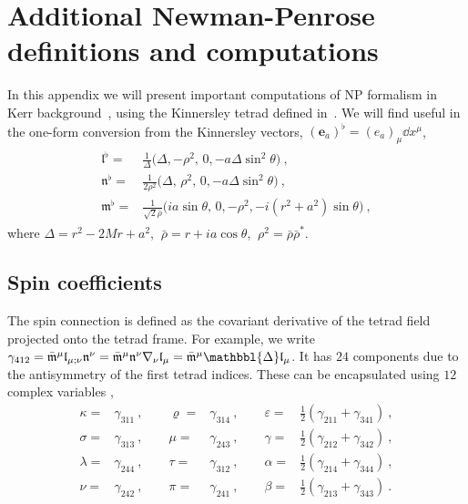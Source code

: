 
\chapter{Additional Newman-Penrose definitions and computations} %
\label{AppendixNPFormalism}

In this appendix we will present important computations of NP formalism in Kerr background~, using the Kinnersley tetrad defined in~.
We will find useful in the one-form conversion from the Kinnersley vectors, $(\bm{e}_a)^\flat = (e_a)_\mu \dd x^\mu$,
\begin{align}
    \begin{split}
        \bm{\mathfrak{l}}^\flat =& \frac{1}{\Delta} \Bigr(\Delta, -\rho^2, \,0, -a \Delta \sin^2\theta \Bigr) ~, \\
        \bm{\mathfrak{n}}^\flat =& \frac{1}{2 \rho^2} \Bigr(\Delta, \,\rho^2, \,0, -a \Delta \sin^2\theta \Bigr) ~, \\
        \bm{\mathfrak{m}}^\flat =& \frac{1}{ \sqrt{2} \bar{\rho} } \Bigr( i a \sin\theta, \,0, -\rho^2, - i (r^2+a^2) \sin\theta \Bigr) ~,
    \end{split}
\end{align}
where $\Delta=r^2-2 M r + a^2$, $~\bar{\rho} = r + i a \cos\theta$, $~\rho^2 = \bar{\rho} \bar{\rho}^*$.

\section{Spin coefficients}
\label{AppendixNPSpinCoef}

The spin connection is defined as the covariant derivative of the tetrad field projected onto the tetrad frame. 
For example, we write $\gamma_{412} = \bar{\mathfrak{m}}^\mu \mathfrak{l}_{\mu;\nu} \mathfrak{n}^\nu =  \bar{\mathfrak{m}}^\mu \mathfrak{n}^\nu \nabla_\nu \mathfrak{l}_{\mu} = \bar{\mathfrak{m}}^\mu \mathbbl{\Delta} \mathfrak{l}_\mu$.
It has $24$ components due to the antisymmetry of the first tetrad indices. These can be encapsulated using $12$ complex variables \cite{Chandrasekhar1998},
\begin{equation}
    \begin{alignedat}{4}
        \kappa  =& \gamma_{311} ~,\qquad \varrho =& \gamma_{314} ~,\qquad \varepsilon =& \tfrac{1}{2} (\gamma_{211} + \gamma_{341}) ~, \\
        \sigma  =& \gamma_{313} ~,\qquad \mu     =& \gamma_{243} ~,\qquad \gamma      =& \tfrac{1}{2} (\gamma_{212} + \gamma_{342}) ~, \\
        \lambda =& \gamma_{244} ~,\qquad \tau    =& \gamma_{312} ~,\qquad \alpha      =& \tfrac{1}{2} (\gamma_{214} + \gamma_{344}) ~, \\
        \nu     =& \gamma_{242} ~,\qquad \pi     =& \gamma_{241} ~,\qquad \beta       =& \tfrac{1}{2} (\gamma_{213} + \gamma_{343}) ~.
    \end{alignedat}
\end{equation}

